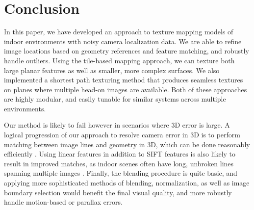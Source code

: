\documentclass[]{spie}  %
\begin{document}
\section{Conclusion}
\label{sec:conclusion}

In this paper, we have developed an approach to texture mapping
models of indoor environments with noisy camera localization data. We
are able to refine image locations based on geometry references and
feature matching, and robustly handle outliers. Using the tile-based
mapping approach, we can texture both large planar features as well as
smaller, more complex surfaces. We also implemented a shortest path
texturing method that produces seamless textures on planes where
multiple head-on images are available. Both of these approaches are
highly modular, and easily tunable for similar systems across multiple
environments.

Our method is likely to fail however in scenarios where 3D error is
large. A logical progression of our approach to resolve camera error
in 3D is to perform matching between image lines and geometry in 3D,
which can be done reasonably efficiently \cite{linebased,
  rectangularstructures}. Using linear features in addition to SIFT
features is also likely to result in improved matches, as indoor
scenes often have long, unbroken lines spanning multiple images
\cite{linearposeestimation}. Finally, the blending procedure is quite
basic, and applying more sophisticated methods of blending,
normalization, as well as image boundary selection would benefit the
final visual quality, and more robustly handle motion-based or
parallax errors.
\end{document}
